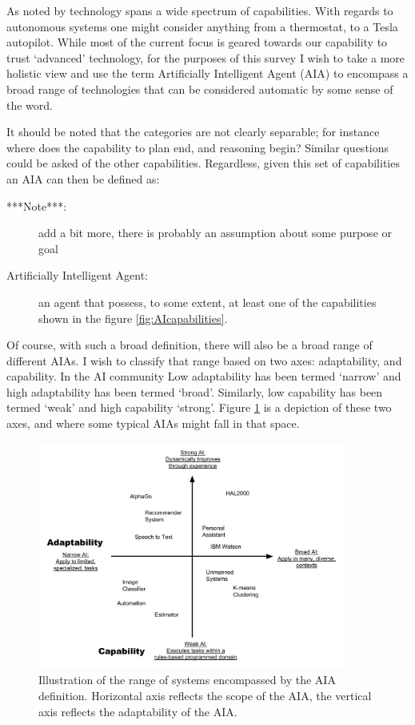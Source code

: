    As noted by \cite{Tripp2011-cq} technology spans a wide spectrum of capabilities. With regards to autonomous systems one might consider anything from a thermostat, to a Tesla autopilot. While most of the current focus is geared towards our capability to trust `advanced' technology, for the purposes of this survey I wish to take a more holistic view and use the term Artificially Intelligent Agent (AIA) to encompass a broad range of technologies that can be considered automatic by some sense of the word.

    It should be noted that the categories are not clearly separable; for instance where does the capability to plan end, and reasoning begin? Similar questions could be asked of the other capabilities. Regardless, given this set of capabilities an AIA can then be defined as:
    
    \begin{description}
    	\item [***Note***:] add a bit more, there is probably an assumption about some purpose or goal
        \item[Artificially Intelligent Agent:] an agent that possess, to some extent, at least one of the capabilities shown in the figure \ref{fig:AIcapabilities}. 
    \end{description}

    Of course, with such a broad definition, there will also be a broad range of different AIAs. I wish to classify that range based on two axes: adaptability, and capability. In the AI community Low adaptability has been termed `narrow' and high adaptability has been termed `broad'. Similarly, low capability has been termed `weak' and high capability `strong'. Figure \ref{fig:StrongWeak} is a depiction of these two axes, and where some typical AIAs might fall in that space.

	\begin{figure}[htbp]
    	\centering
     	\includegraphics[width=0.9\textwidth]{Figures/strong_weak_narrow_broad.pdf}
    	\caption{Illustration of the range of systems encompassed by the AIA definition. Horizontal axis reflects the scope of the AIA, the vertical axis reflects the adaptability of the AIA.}
        \label{fig:StrongWeak}
    \end{figure}

